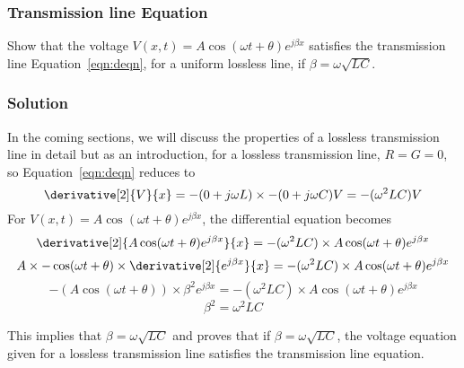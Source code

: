 \begin{exmp}
\subsubsection*{Transmission line Equation}
Show that the voltage $V(x,t) = A\cos(\omega t+\theta)e^{j\beta x}$ satisfies the transmission line Equation~\eqref{eqn:deqn}, for a uniform lossless line, if $\beta = \omega\sqrt{LC}$.

\subsubsection*{Solution}
In the coming sections, we will discuss the properties of a lossless transmission line in detail but as an introduction, for a lossless transmission line, $R = G = 0$, so Equation~\eqref{eqn:deqn} reduces to
\begin{dmath*}
\derivative[2]{V}{x} = -(0 + j\omega L)\times -(0 + j\omega C)V
= -(\omega^2 LC)V
\end{dmath*}
For $V(x,t) = A\cos(\omega t+\theta)e^{j\beta x}$, the differential equation becomes
\begin{dmath*}
\derivative[2]{A\cos(\omega t+\theta)e^{j\beta x}}{x} = -(\omega^2 LC)\times A\cos(\omega t+\theta)e^{j\beta x}
\end{dmath*}
\begin{dmath*}
A\times -\cos(\omega t+\theta)\times\derivative[2]{e^{j\beta x}}{x} = -(\omega^2 LC)\times A\cos(\omega t+\theta)e^{j\beta x}
\end{dmath*}
\begin{dmath*}
-(A\cos(\omega t+\theta))\times\beta^2e^{j\beta x} = -(\omega^2 LC)\times A\cos(\omega t+\theta)e^{j\beta x}
\end{dmath*}
\begin{dmath*}
\beta^2 = \omega^2 LC
\end{dmath*}

This implies that $\beta = \omega\sqrt{LC}$ and proves that if $\beta = \omega\sqrt{LC}$, the voltage equation given for a lossless transmission line satisfies the transmission line equation.
\end{exmp}


